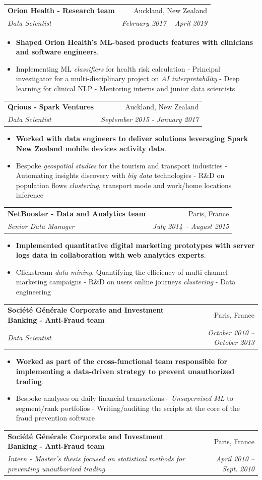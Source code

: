 \documentclass[letterpaper,11pt]{article}
\makeatletter
\newcommand{\resumeItemBis}[2]{
  \item\small{
    \textbf{#1}{#2 \vspace{-2pt}}
  }
}
\newcommand{\resumeSubheading}[4]{
  \vspace{-1pt}\item
    \begin{tabular*}{0.97\textwidth}[t]{l@{\extracolsep{\fill}}r}
      \textbf{#1} & #2 \\
      \textit{\small#3} & \textit{\small #4} \\
    \end{tabular*}\vspace{-5pt}
}
\newcommand{\resumeItemListStart}{\begin{itemize}}
\newcommand{\resumeItemListEnd}{\end{itemize}\vspace{-5pt}}
\makeatother
\begin{document}
    \resumeSubheading
      {Orion Health - Research team}{Auckland, New Zealand}
      {Data Scientist}{February 2017 -- April 2019}
      \resumeItemListStart
        \resumeItemBis{Shaped Orion Health's ML-based products features with clinicians and software engineers}{.}
            \resumeItemBis{} {Implementing ML \emph{classifiers} for health risk calculation - Principal investigator for a multi-disciplinary project on \emph{AI interpretability} - Deep learning for clinical NLP - Mentoring interns and junior data scientists}
           \resumeItemListEnd

    \resumeSubheading
      {Qrious - Spark Ventures}{Auckland, New Zealand}
      {Data Scientist}{September 2015 - January 2017}
      \resumeItemListStart
        \resumeItemBis{Worked with data engineers to deliver solutions leveraging Spark New Zealand mobile devices activity data}{.}
            \resumeItemBis{} {Bespoke \emph{geospatial studies} for the tourism and transport industries - Automating insights discovery with \emph{big data} technologies - R\&D on population flows \emph{clustering}, transport mode and work/home locations inference}
           \resumeItemListEnd

    \resumeSubheading
      {NetBooster - Data and Analytics team}{Paris, France}
      {Senior Data Manager}{July 2014 -- August 2015}
        \resumeItemListStart
        \resumeItemBis{Implemented quantitative digital marketing prototypes with server logs data in collaboration with web analytics experts}{.}
            \resumeItemBis{} {Clickstream \emph{data mining}, Quantifying the efficiency of multi-channel marketing campaigns - R\&D on users online journeys \emph{clustering} - Data engineering}
           \resumeItemListEnd

    \resumeSubheading
      {Société Générale Corporate and Investment Banking - Anti-Fraud team}{Paris, France}
      {Data Scientist}{October 2010 -- October 2013}
      \resumeItemListStart
        \resumeItemBis{Worked as part of the cross-functional team responsible for implementing a data-driven strategy to prevent unauthorized trading}{.}
            \resumeItemBis{} {Bespoke analyses on daily financial transactions - \emph{Unsupervised ML} to segment/rank portfolios - Writing/auditing the scripts at the core of the fraud prevention software}
           \resumeItemListEnd
      
      \resumeSubheading
      {Société Générale Corporate and Investment Banking - Anti-Fraud team}{Paris, France}
      {Intern - Master's thesis focused on statistical methods for preventing unauthorized trading}{April 2010 -- Sept. 2010}
      
\end{document}
